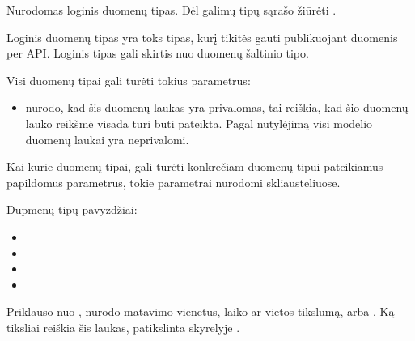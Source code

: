 \documentclass[letterpaper,10pt,lithuanian]{sphinxmanual}
\begin{document}
\begin{fulllineitems}
\label{\detokenize{dimensijos:property.type}}
\pysigstartsignatures
{}
\pysigstopsignatures
\sphinxAtStartPar
Nurodomas loginis duomenų tipas. Dėl galimų tipų sąrašo žiūrėti
{\hyperref[\detokenize{tipai:duomenu-tipai}]{}}.

\sphinxAtStartPar
Loginis duomenų tipas yra toks tipas, kurį tikitės gauti publikuojant
duomenis per API. Loginis tipas gali skirtis nuo duomenų šaltinio tipo.

\sphinxAtStartPar
Visi duomenų tipai gali turėti tokius parametrus:
\begin{itemize}
\item {} 
\sphinxAtStartPar
{} \sphinxhyphen{} nurodo, kad šis duomenų laukas yra privalomas, tai reiškia,
kad šio duomenų lauko reikšmė visada turi būti pateikta. Pagal nutylėjimą
visi modelio duomenų laukai yra neprivalomi.

\end{itemize}

\sphinxAtStartPar
Kai kurie duomenų tipai, gali turėti konkrečiam duomenų tipui pateikiamus
papildomus parametrus, tokie parametrai nurodomi skliausteliuose.

\sphinxAtStartPar
Dupmenų tipų pavyzdžiai:
\begin{itemize}
\item {} 
\sphinxAtStartPar
{}

\item {} 
\sphinxAtStartPar
{}

\item {} 
\sphinxAtStartPar
{}

\item {} 
\sphinxAtStartPar
{}

\end{itemize}

\end{fulllineitems}


\begin{fulllineitems}
\label{\detokenize{dimensijos:property.ref}}
\pysigstartsignatures
{}
\pysigstopsignatures
\sphinxAtStartPar
Priklauso nuo , nurodo matavimo vienetus, laiko ar vietos
tikslumą, {\hyperref[\detokenize{dimensijos:enum}]{}} arba {\hyperref[\detokenize{identifikatoriai:rysiai}]{}}. Ką tiksliai reiškia šis laukas, patikslinta skyrelyje
{\hyperref[\detokenize{tipai:duomenu-tipai}]{}}.

\end{fulllineitems}
\end{document}
